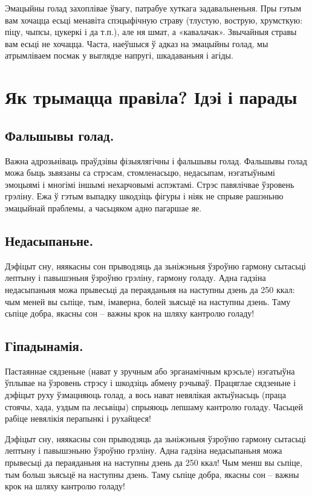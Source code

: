 Эмацыйны голад захоплівае ўвагу, патрабуе хуткага задавальненьня. Пры гэтым вам хочацца есьці менавіта спэцыфічную страву (тлустую, вострую, хрумсткую: піцу, чыпсы, цукеркі і да т.п.), але ня шмат, а «кавалачак». Звычайныя стравы вам есьці не хочацца. Часта, наеўшыся ў адказ на эмацыйны голад, мы атрымліваем посмак у выглядзе напругі, шкадаваньня і агіды.

\section{Як трымацца правіла? Ідэі і парады}

\subsection{Фальшывы голад.}
Важна адрозьніваць праўдзівы фізыялягічны і фальшывы голад. Фальшывы голад можа быць зьвязаны са стрэсам, стомленасьцю, недасыпам, нэгатыўнымі эмоцыямі і многімі іншымі нехарчовымі аспэктамі. Стрэс павялічвае ўзровень грэліну. Ежа ў гэтым выпадку шкодзіць фігуры і ніяк не спрыяе рашэньню эмацыйнай праблемы, а часьцяком адно пагаршае яе.

\subsection{Недасыпаньне.}
Дэфіцыт сну, няякасны сон прыводзяць да зьніжэньня ўзроўню гармону сытасьці лептыну і павышэньня ўзроўню грэліну, гармону голаду. Адна гадзіна недасыпаньня можа прывесьці да пераяданьня на наступны дзень да 250 ккал: чым меней вы сьпіце, тым, імаверна, болей зьясьцё на наступны дзень. Таму сьпіце добра, якасны сон – важны крок на шляху кантролю голаду!

\subsection{Гіпадынамія.}
Пастаяннае сядзеньне (нават у зручным або эрганамічным крэсьле) нэгатыўна ўплывае на ўзровень стрэсу і шкодзіць абмену рэчываў. Працяглае сядзеньне і дэфіцыт руху ўзмацняюць голад, а вось нават невялікая актыўнасьць (праца стоячы, хада, уздым па лесьвіцы) спрыяюць лепшаму кантролю голаду. Часьцей рабіце невялікія перапынкі і рухайцеся!

Дэфіцыт сну, няякасны сон прыводзяць да зьніжэньня ўзроўню гармону сытасьці лептыну і павышэньню ўзроўню грэліну. Адна гадзіна недасыпаньня можа прывесьці да пераяданьня на наступны дзень да 250 ккал! Чым менш вы сьпіце, тым больш зьясьцё на наступны дзень. Таму сьпіце добра, якасны сон – важны крок на шляху кантролю голаду!

